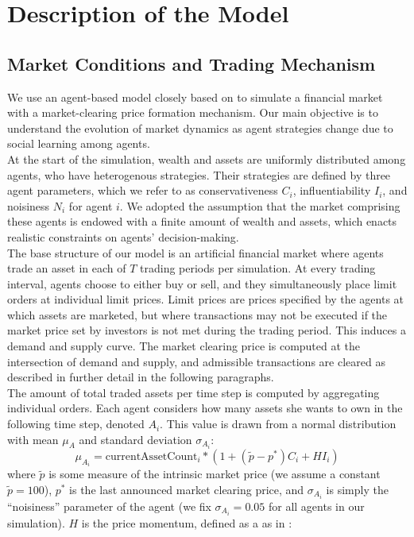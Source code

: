 \documentclass[11pt]{article}
\begin{document}
\section{Description of the Model}

\subsection{Market Conditions and Trading Mechanism}
We use an agent-based model closely based on \citet{raberto2001agent} to simulate a financial market with a market-clearing price formation mechanism. Our main objective is to understand the evolution of market dynamics as agent strategies change due to social learning among agents. \\
At the start of the simulation, wealth and assets are uniformly distributed among agents, who have heterogenous strategies. Their strategies are defined by three agent parameters, which we refer to as conservativeness $C_i$, influentiability $I_i$, and noisiness $N_i$ for agent $i$. We adopted the assumption that the market comprising these agents is endowed with a finite amount of wealth and assets, which enacts realistic constraints on agents' decision-making. \\
The base structure of our model is an artificial financial market where agents trade an asset in each of $T$ trading periods per simulation. At every trading interval, agents choose to either buy or sell, and they simultaneously place limit orders at individual limit prices. Limit prices are prices specified by the agents at which assets are marketed, but where transactions may not be executed if the market price set by investors is not met during the trading period. This induces a demand and supply curve. The market clearing price is computed at the intersection of demand and supply, and admissible transactions are cleared as described in further detail in the following paragraphs. \\
The amount of total traded assets per time step is computed by aggregating individual orders. Each agent considers how many assets she wants to own in the following time step, denoted $A_i$. This value is drawn from a normal distribution with mean $\mu_A$ and standard deviation $\sigma_{A_i}$:
\begin{equation}
\mu_{A_i} = \text{currentAssetCount}_i * (1 + (\tilde{p} - p^{*}) C_i + H I_i)
\end{equation}
where $\tilde{p}$ is some measure of the intrinsic market price (we assume a constant $\tilde{p}=100$), $p^*$ is the last announced market clearing price, and $\sigma_{A_i}$ is simply the ``noisiness'' parameter of the agent (we fix $\sigma_{A_i} = 0.05$ for all agents in our simulation). $H$ is the price momentum, defined as a as in \citet {kaizoji2015super}:
\end{document}

